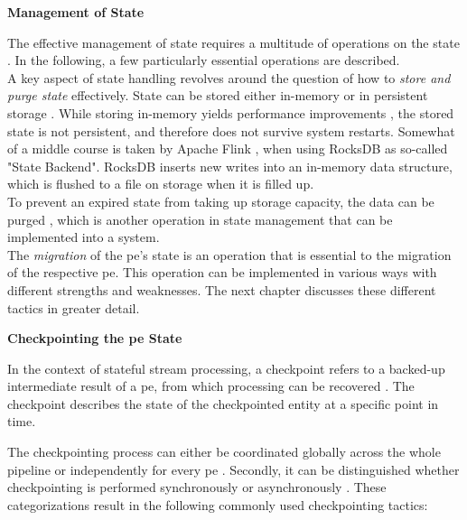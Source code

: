 \textbf{Management of State}\par
The effective management of state requires a multitude of operations on the state \cite{To.2017}. In the following, a few particularly essential operations are described.\\
A key aspect of state handling revolves around the question of how to \textit{store and purge state} effectively. State can be stored either in-memory or in persistent storage \cite{To.2017}. While storing in-memory yields performance improvements \cite{Venkatesh.2019}, the stored state is not persistent, and therefore does not survive system restarts. Somewhat of a middle course is taken by Apache Flink \cite{.06082020}, when using RocksDB as so-called "State Backend". RocksDB \cite{GitHub.06082020} inserts new writes into an in-memory data structure, which is flushed to a file on storage when it is filled up.\\
To prevent an expired state from taking up storage capacity, the data can be purged \cite{To.2017}, which is another operation in state management that can be implemented into a system.\\
The \textit{migration} of the \gls{pe}'s state is an operation that is essential to the migration of the respective \gls{pe}. This operation can be implemented in various ways with different strengths and weaknesses. The next chapter discusses these different tactics in greater detail.\par

\textbf{Checkpointing the \gls{pe} State}\par
In the context of stateful stream processing, a checkpoint refers to a backed-up intermediate result of a \gls{pe}, from which processing can be recovered \cite{Zheng.20}. The checkpoint describes the state of the checkpointed entity at a specific point in time.\par
The checkpointing process can either be coordinated globally across the whole pipeline or independently for every \gls{pe} \cite{Gibson.2014}. Secondly, it can be distinguished whether checkpointing is performed synchronously or asynchronously \cite{Gibson.2014}. These categorizations result in the following commonly used checkpointing tactics:

